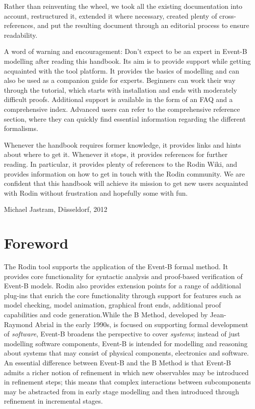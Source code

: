 \documentclass[12pt]{book}
\begin{document}
Rather than reinventing the wheel, we took all the existing documentation into account, restructured it, extended it where necessary, created plenty of cross-references, and put the resulting document through an editorial process to ensure readability.

A word of warning and encouragement: Don't expect to be an expert in Event-B modelling after reading this handbook.  Its aim is to provide support while getting acquainted with the tool platform. It provides the basics of modelling and can also be used as a companion guide for experts.  Beginners can work their way through the tutorial, which starts with installation and ends with moderately difficult proofs.  Additional support is available in the form of an FAQ and a comprehensive index.  Advanced users can refer to the comprehensive reference section, where they can quickly find essential information regarding the different formalisms.

Whenever the handbook requires former knowledge, it provides links and hints about where to get it.  Whenever it stops, it provides references for further reading.  In particular, it provides plenty of references to the Rodin Wiki, and provides information on how to get in touch with the Rodin community.  We are confident that this handbook will achieve its mission to get new users acquainted with Rodin without frustration and hopefully some with fun.

\begin{flushright}
  Michael Jastram, Düsseldorf, 2012
\end{flushright}

\chapter*{Foreword}
\label{foreword}

The Rodin tool supports the application of the Event-B formal method.  It provides core functionality for syntactic analysis and proof-based verification of Event-B models. Rodin also provides extension points for a range of additional plug-ins that enrich the core functionality through support for features such as model checking, model animation, graphical front ends, additional proof capabilities and code generation.While the B Method, developed by Jean-Raymond Abrial in the early 1990s, is focused on supporting formal development of \textit{software}, Event-B broadens the perspective to cover \textit{systems}; instead of just modelling software components, Event-B is intended for modelling and reasoning about systems that may consist of physical components, electronics and software.  An essential difference between Event-B and the B Method is that Event-B admits a richer notion of refinement in which new observables may be introduced in refinement steps; this means that complex interactions between subcomponents may be abstracted from in early stage modelling and then introduced through refinement in incremental stages.  
\end{document}
